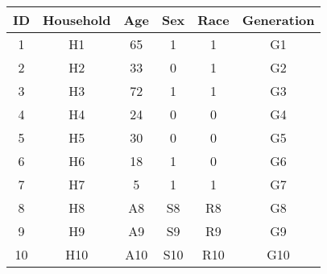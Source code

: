 \begin{tabular}{cccccc}
ID & Household & Age & Sex & Race & Generation \\
\hline
\hline
1 & H1 & 65 & 1 & 1 & G1  \\
\hline
2 & H2 & 33 & 0 & 1 & G2  \\
\hline
3 & H3 & 72 & 1 & 1 & G3  \\
\hline
4 & H4 & 24 & 0 & 0 & G4  \\
\hline
5 & H5 & 30 & 0 & 0 & G5  \\
\hline
6 & H6 & 18 & 1 & 0 & G6  \\
\hline
7 & H7 & 5 & 1 & 1 & G7  \\
\hline
8 & H8 & A8 & S8 & R8 & G8  \\
\hline
9 & H9 & A9 & S9 & R9 & G9  \\
\hline
10 & H10 & A10 & S10 & R10 & G10  \\
\hline
\end{tabular}
